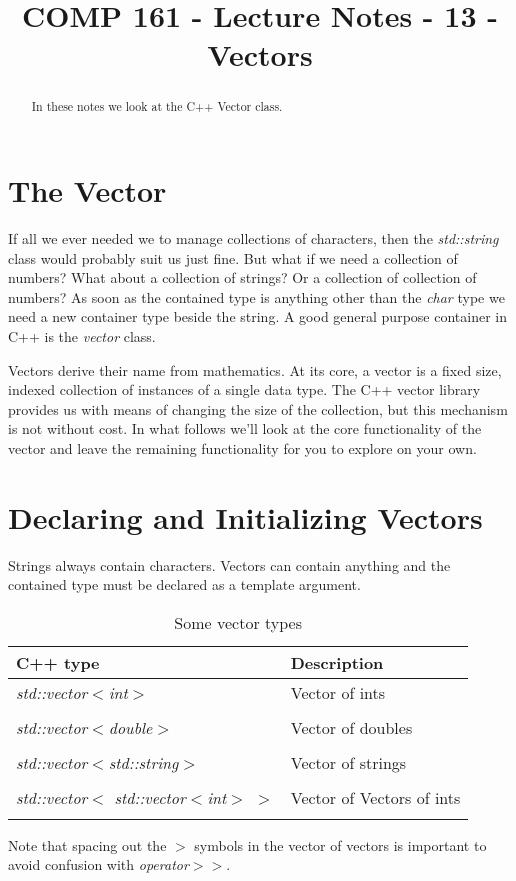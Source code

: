 \documentclass[]{tufte-handout}
\title{COMP 161 - Lecture Notes - 13 - Vectors}
\begin{document}
 
\maketitle

\begin{abstract}
In these notes we look at the C++ Vector class.
\end{abstract}

\section{The Vector}

If all we ever needed we to manage collections of characters, then the \textit{std::string} class would probably suit us just fine.  But what if we need a collection of numbers? What about a collection of strings? Or a collection of collection of numbers?  As soon as the contained type is anything other than the \textit{char} type we need a new container type beside the string. A good general purpose container in C++ is the \textit{vector} class.

Vectors derive their name from mathematics.  At its core, a vector is a fixed size, indexed collection of instances of a single data type.  The C++ vector library provides us with means of changing the size of the collection, but this mechanism is not without cost. In what follows we'll look at the core functionality of the vector and leave the remaining functionality for you to explore on your own.  

\section{Declaring and Initializing Vectors}

Strings always contain characters. Vectors can contain anything and the contained type must be declared as a template argument.  

\begin{table}[ht]
\center
\small
\caption{Some vector types}
\begin{tabular}{ll}
C++ type & Description\\ \hline
\textit{std::vector$<$int$>$} & Vector of ints \\ \\
\textit{std::vector$<$double$>$} & Vector of doubles \\ \\
\textit{std::vector$<$std::string$>$} & Vector of strings \\ \\
\textit{std::vector$<$ std::vector$<$int$>$ $>$} & Vector of Vectors of ints\\ \\ 
\end{tabular}
\end{table}
Note that spacing out the $>$ symbols in the vector of vectors is important to avoid confusion with \textit{operator$>>$}. 
\end{document}
